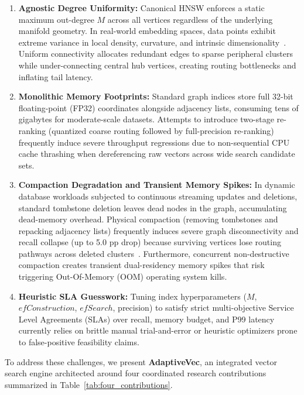 \documentclass[10pt,journal,compsoc]{IEEEtran}
\begin{document}
\begin{enumerate}
    \item \textbf{Agnostic Degree Uniformity:} Canonical HNSW enforces a static maximum out-degree $M$ across all vertices regardless of the underlying manifold geometry. In real-world embedding spaces, data points exhibit extreme variance in local density, curvature, and intrinsic dimensionality~\cite{levina2004maximum, houle2017local}. Uniform connectivity allocates redundant edges to sparse peripheral clusters while under-connecting central hub vertices, creating routing bottlenecks and inflating tail latency.
    \item \textbf{Monolithic Memory Footprints:} Standard graph indices store full 32-bit floating-point (FP32) coordinates alongside adjacency lists, consuming tens of gigabytes for moderate-scale datasets. Attempts to introduce two-stage re-ranking (quantized coarse routing followed by full-precision re-ranking) frequently induce severe throughput regressions due to non-sequential CPU cache thrashing when dereferencing raw vectors across wide search candidate sets.
    \item \textbf{Compaction Degradation and Transient Memory Spikes:} In dynamic database workloads subjected to continuous streaming updates and deletions, standard tombstone deletion leaves dead nodes in the graph, accumulating dead-memory overhead. Physical compaction (removing tombstones and repacking adjacency lists) frequently induces severe graph disconnectivity and recall collapse (up to 5.0 pp drop) because surviving vertices lose routing pathways across deleted clusters~\cite{gollapudi2023freshdiskann}. Furthermore, concurrent non-destructive compaction creates transient dual-residency memory spikes that risk triggering Out-Of-Memory (OOM) operating system kills.
    \item \textbf{Heuristic SLA Guesswork:} Tuning index hyperparameters ($M$, $efConstruction$, $efSearch$, precision) to satisfy strict multi-objective Service Level Agreements (SLAs) over recall, memory budget, and P99 latency currently relies on brittle manual trial-and-error or heuristic optimizers prone to false-positive feasibility claims.
\end{enumerate}

To address these challenges, we present \textbf{AdaptiveVec}, an integrated vector search engine architected around four coordinated research contributions summarized in Table~\ref{tab:four_contributions}.


\end{document}
